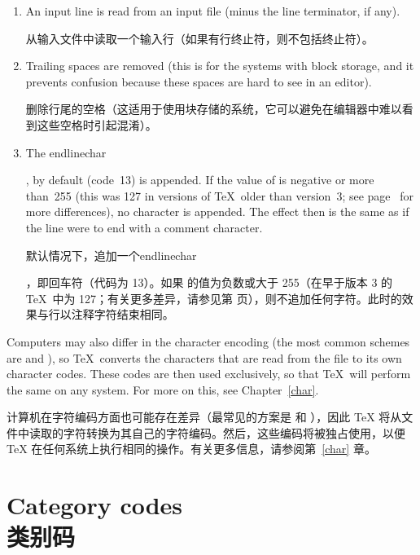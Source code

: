 

\begin{enumerate}
\item An input line is read from an input file  (minus the
line terminator, if any).

从输入文件中读取一个输入行（如果有行终止符，则不包括终止符）。
\item Trailing spaces are removed (this is for the systems
with block storage, and it prevents confusion because these
spaces are hard to see in an editor).

删除行尾的空格（这适用于使用块存储的系统，它可以避免在编辑器中难以看到这些空格时引起混淆）。
\item The \cstoidx endlinechar\par, by default 
(code~13) is appended.
If the value of  is negative
\label{append:elc}%
or more than~255 (this was 127 in versions of \TeX\ older
than version~3; see page~\pageref{2vs3} for more differences),
no character is appended. 
The effect then is the same as
if the line were to end with a comment character.

默认情况下，追加一个\cstoidx endlinechar\par，即回车符（代码为 13）。如果  的值为负数或大于 255（在早于版本 3 的 \TeX\ 中为 127；有关更多差异，请参见第 \pageref{2vs3} 页），则不追加任何字符。此时的效果与行以注释字符结束相同。
\end{enumerate}


Computers may also differ in the character encoding
(the most common schemes are \ascii{} and \ebcdic{}), so \TeX\
converts the characters that are read from the file to its
own character codes. These codes are then used exclusively,
so that \TeX\ will perform the same on any system.
For more on this, see Chapter~\ref{char}.

计算机在字符编码方面也可能存在差异（最常见的方案是 \ascii{} 和 \ebcdic{}），因此 \TeX{} 将从文件中读取的字符转换为其自己的字符编码。然后，这些编码将被独占使用，以便 \TeX{} 在任何系统上执行相同的操作。有关更多信息，请参阅第~\ref{char} 章。



\section{Category codes\\类别码}

